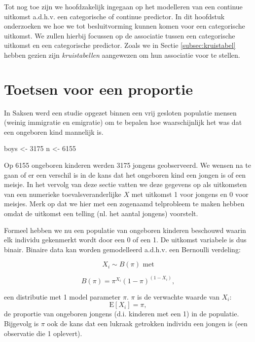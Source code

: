 \documentclass[
  12pt,dutch,coursenotes]{book}
\newenvironment{Shaded}{\begin{snugshade}}{\end{snugshade}}
\newcommand{\DecValTok}[1]{\textcolor[rgb]{0.00,0.00,0.81}{#1}}
\newcommand{\NormalTok}[1]{#1}
\newcommand{\StringTok}[1]{\textcolor[rgb]{0.31,0.60,0.02}{#1}}
\theoremstyle{definition}
\theoremstyle{definition}
\theoremstyle{definition}
\theoremstyle{remark}
\begin{document}
Tot nog toe zijn we hoofdzakelijk ingegaan op het modelleren van een continue uitkomst a.d.h.v. een categorische of continue predictor.
In dit hoofdstuk onderzoeken we hoe we tot besluitvorming kunnen komen voor een categorische uitkomst.
We zullen hierbij focussen op de associatie tussen een categorische uitkomst en een categorische predictor.
Zoals we in Sectie \ref{subsec:kruistabel} hebben gezien zijn \emph{kruistabellen} aangewezen om hun associatie voor te stellen.

\hypertarget{toetsen-voor-een-proportie}{%
\section{Toetsen voor een proportie}\label{toetsen-voor-een-proportie}}

In Saksen werd een studie opgezet binnen een vrij gesloten populatie mensen (weinig immigratie en emigratie) om te bepalen hoe waarschijnlijk het was dat een ongeboren kind mannelijk is.

\begin{Shaded}
\begin{Highlighting}[]
\NormalTok{boys \textless{}{-}}\StringTok{ }\DecValTok{3175}
\NormalTok{n \textless{}{-}}\StringTok{ }\DecValTok{6155}
\end{Highlighting}
\end{Shaded}

Op 6155 ongeboren kinderen werden 3175 jongens
geobserveerd.
We wensen na te gaan of er een verschil is in de kans dat het ongeboren kind een jongen is of een meisje.
In het vervolg van deze sectie vatten we deze gegevens op als uitkomsten van een numerieke toevalsveranderlijke \(X\) met uitkomst 1 voor jongens en 0 voor meisjes.
Merk op dat we hier met een zogenaamd telprobleem te maken hebben omdat de uitkomst een telling (nl. het aantal jongens) voorstelt.

Formeel hebben we nu een populatie van ongeboren kinderen beschouwd
waarin elk individu gekenmerkt wordt door een 0 of een 1.
De uitkomst variabele is dus binair.
Binaire data kan worden gemodelleerd a.d.h.v. een Bernoulli verdeling:

\[X_i \sim B(\pi) \text{ met}\]

\[B(\pi)=\pi^{X_i}(1-\pi)^{(1-X_i)},\]

een distributie met 1 model parameter \(\pi\).
\(\pi\) is de verwachte waarde van \(X_i\): \[\text{E}[X_i]=\pi,\]
de proportie van ongeboren jongens (d.i. kinderen met een 1) in
de populatie.
Bijgevolg is \(\pi\) ook de kans dat een lukraak getrokken individu een jongen is (een observatie die 1 oplevert).
\end{document}
